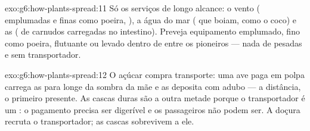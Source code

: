 \begin{solution}{exo:g6:how-plants-spread:11}
Só os serviços de longo alcance: o vento ( emplumadas e finas
como poeira, ), a água do mar ( que boiam, como o coco) e
as  ( de  carnudos carregadas no intestino). Preveja
equipamento emplumado, fino como poeira, flutuante ou levado dentro de
 entre os pioneiros --- nada de  pesadas e sem
transportador.
\end{solution}

\begin{solution}{exo:g6:how-plants-spread:12}
O açúcar compra transporte: uma ave paga em polpa carrega as 
para longe da sombra da mãe e as deposita com adubo --- a distância, o
primeiro presente. As cascas duras são a outra metade porque o
transportador é um : o pagamento precisa ser digerível e
os passageiros não podem ser. A doçura recruta o transportador; as
cascas sobrevivem a ele.
\end{solution}

